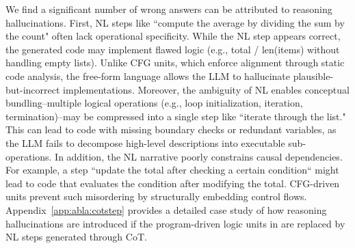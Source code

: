 We find a significant number of wrong answers can be attributed to reasoning hallucinations.
First, NL steps like ``compute the average by dividing the sum by the count" often lack operational specificity. While the NL step appears correct, the generated code may implement flawed logic (e.g., total / len(items) without handling empty lists). 
Unlike CFG units, which enforce alignment through static code analysis, the free-form language allows the LLM to hallucinate plausible-but-incorrect implementations. 
Moreover, the ambiguity of NL enables conceptual bundling--multiple logical operations (e.g., loop initialization, iteration, termination)--may be compressed into a single step like ``iterate through the list." 
This can lead to code with missing boundary checks or redundant variables, as the LLM fails to decompose high-level descriptions into executable sub-operations.
In addition, the NL narrative poorly constrains causal dependencies. For example, a step ``update the total after checking a certain condition`` might lead to code that evaluates the condition after modifying the total. CFG-driven units prevent such misordering by structurally embedding control flows.
Appendix~\ref{app:abla:cotstep} provides a detailed case study of how reasoning hallucinations are introduced if the program-driven logic units in \tool are replaced by NL steps generated through CoT.








